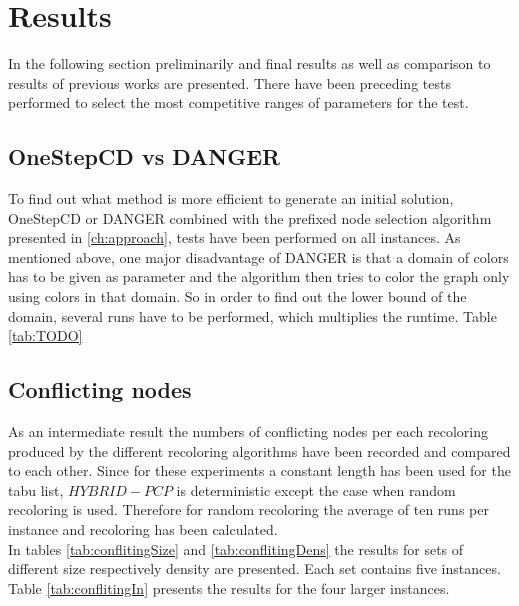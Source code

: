 \section{Results}
In the following section preliminarily and final results as well as comparison to results of previous works are presented. There have been preceding tests performed to select the most competitive ranges of parameters for the test.

\subsection{OneStepCD vs DANGER}

To find out what method is more efficient to generate an initial solution, OneStepCD or DANGER combined with the prefixed node selection algorithm presented in \ref{ch:approach}, tests have been performed on all instances. As mentioned above, one major disadvantage of DANGER is that a domain of colors has to be given as parameter and the algorithm then tries to color the graph only using colors in that domain. So in order to find out the lower bound of the domain, several runs have to be performed, which multiplies the runtime. Table \ref{tab:TODO}

\subsection{Conflicting nodes}
As an intermediate result the numbers of conflicting nodes per each recoloring produced by the different recoloring algorithms have been recorded and compared to each other. Since for these experiments a constant length has been used for the tabu list, $HYBRID-PCP$ is deterministic except the case when random recoloring is used. Therefore for random recoloring the average of ten runs per instance and recoloring has been calculated.\\
In tables \ref{tab:conflitingSize} and \ref{tab:conflitingDens} the results for sets of different size respectively density are presented. Each set contains five instances. Table \ref{tab:conflitingIn} presents the results for the four larger instances.\\

